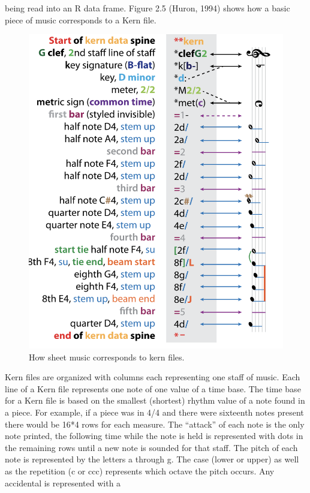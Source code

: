 \documentclass[12pt,twoside]{reedthesis}
\theoremstyle{definition}
\theoremstyle{definition}
\theoremstyle{definition}
\theoremstyle{remark}
\begin{document}
being read into an R data frame. Figure 2.5 (Huron, 1994) shows how a
basic piece of music corresponds to a Kern file.
\begin{figure}[h]
\centering
\includegraphics[scale=.50]{images/krnmusic.png}
\caption{How sheet music corresponds to kern files.}
\label{subd}
\end{figure}
Kern files are organized with columns each representing one staff of
music. Each line of a Kern file represents one note of one value of a
time base. The time base for a Kern file is based on the smallest
(shortest) rhythm value of a note found in a piece. For example, if a
piece was in 4/4 and there were sixteenth notes present there would be
16*4 rows for each measure. The ``attack'' of each note is the only note
printed, the following time while the note is held is represented with
dots in the remaining rows until a new note is sounded for that staff.
The pitch of each note is represented by the letters a through g. The
case (lower or upper) as well as the repetition (c or ccc) represents
which octave the pitch occurs. Any accidental is represented with a
\end{document}
